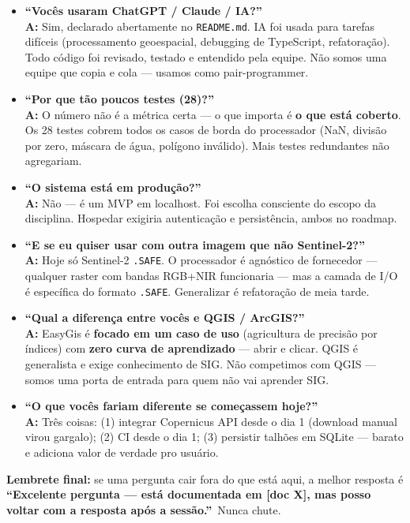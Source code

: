 \documentclass[12pt,a4paper]{article}
\begin{document}
\begin{itemize}

  \item \textbf{\textquotedblleft Vocês usaram ChatGPT / Claude / IA?\textquotedblright}
        \\ \textbf{A:} Sim, declarado abertamente no \texttt{README.md}.
        IA foi usada para tarefas difíceis (processamento geoespacial,
        debugging de TypeScript, refatoração). Todo código foi
        revisado, testado e entendido pela equipe. Não somos uma equipe
        que copia e cola — usamos como pair-programmer.

  \item \textbf{\textquotedblleft Por que tão poucos testes (28)?\textquotedblright}
        \\ \textbf{A:} O número não é a métrica certa — o que importa é
        \textbf{o que está coberto}. Os 28 testes cobrem todos os casos
        de borda do processador (NaN, divisão por zero, máscara de água,
        polígono inválido). Mais testes redundantes não agregariam.

  \item \textbf{\textquotedblleft O sistema está em produção?\textquotedblright}
        \\ \textbf{A:} Não — é um MVP em localhost. Foi escolha
        consciente do escopo da disciplina. Hospedar exigiria autenticação
        e persistência, ambos no roadmap.

  \item \textbf{\textquotedblleft E se eu quiser usar com outra imagem que não Sentinel-2?\textquotedblright}
        \\ \textbf{A:} Hoje só Sentinel-2 \texttt{.SAFE}. O processador é
        agnóstico de fornecedor — qualquer raster com bandas RGB+NIR
        funcionaria — mas a camada de I/O é específica do formato \texttt{.SAFE}.
        Generalizar é refatoração de meia tarde.

  \item \textbf{\textquotedblleft Qual a diferença entre vocês e QGIS / ArcGIS?\textquotedblright}
        \\ \textbf{A:} EasyGis é \textbf{focado em um caso de uso}
        (agricultura de precisão por índices) com \textbf{zero curva de
        aprendizado} — abrir e clicar. QGIS é generalista e exige
        conhecimento de SIG. Não competimos com QGIS — somos uma porta de
        entrada para quem não vai aprender SIG.

  \item \textbf{\textquotedblleft O que vocês fariam diferente se começassem hoje?\textquotedblright}
        \\ \textbf{A:} Três coisas: (1) integrar Copernicus API desde o
        dia 1 (download manual virou gargalo); (2) CI desde o dia 1;
        (3) persistir talhões em SQLite — barato e adiciona valor de
        verdade pro usuário.

\end{itemize}

\vspace{8pt}
\textbf{Lembrete final:} se uma pergunta cair fora do que está aqui, a
melhor resposta é \textbf{\textquotedblleft Excelente pergunta — está
documentada em [doc X], mas posso voltar com a resposta após a
sessão.\textquotedblright}\ Nunca chute.
\end{document}
